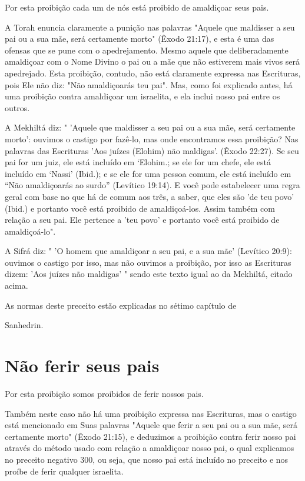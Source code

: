 Por esta proibição cada um de nós está proibido de amaldiçoar seus pais.


A Torah enuncia claramente a punição nas palavras "Aquele que mal­disser
a seu pai ou a sua mãe, será certamente morto" (Êxodo 21:17), e esta é
uma das ofensas que se pune com o apedrejamento. Mesmo aquele que
deli­beradamente amaldiçoar com o Nome Divino o pai ou a mãe que não
estive­rem mais vivos será apedrejado. Esta proibição, contudo, não está
claramente expressa nas Escrituras, pois Ele não diz: "Não amaldiçoarás
teu pai". Mas, co­mo foi explicado antes, há uma proibição contra
amaldiçoar um israelita, e ela inclui nosso pai entre os outros.

A Mekhiltá diz: " 'Aquele que maldisser a seu pai ou a sua mãe, será
certamente morto': ouvimos o castigo por fazê-lo, mas onde encontramos
essa proibição? Nas palavras das Escrituras 'Aos juízes (Elohim) não
maldigas'. (Êxo­do 22:27). Se seu pai for um juiz, ele está incluído em
`Elohim.; se ele for um chefe, ele está incluído em
`Nassi' (Ibid.); e se ele for uma pessoa comum, ele está incluído em
``Não amaldiçoarás ao surdo'' (Levítico 19:14). E você pode estabelecer
uma regra geral com base no que há de comum aos três, a saber, que eles
são 'de teu povo' (Ibid.) e portanto você está proibido de
amaldiçoá-los. Assim também com relação a seu pai. Ele pertence a 'teu
povo' e portanto você está proibido de amaldiçoá-lo".

A Sifrá diz: " 'O homem que amaldiçoar a seu pai, e a sua mãe'
(Leví­tico 20:9): ouvimos o castigo por isso, mas não ouvimos a
proibição, por isso as Escrituras dizem: 'Aos juízes não maldigas' "
sendo este texto igual ao da Mekhiltá, citado acima.


As normas deste preceito estão explicadas no sétimo capítulo de


Sanhedrin.

\section{Não ferir seus pais}


Por esta proibição somos proibidos de ferir nossos pais.


Também neste caso não há uma proibição expressa nas Escrituras, mas o
castigo está mencionado em Suas palavras "Aquele que ferir a seu pai ou
a sua mãe, será certamente morto" (Êxodo 21:15), e deduzimos a proibição
contra ferir nosso pai através do método usado com relação a amaldiçoar
nos­so pai, o qual explicamos no preceito negativo 300, ou seja, que
nosso pai está incluído no preceito e nos proíbe de ferir qualquer
israelita.

